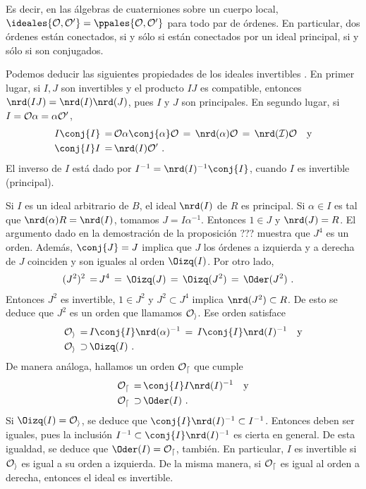 Es decir, en las \'{a}lgebras de cuaterniones sobre un cuerpo local,
$\ideales{\cal{O},\cal{O}'}=\ppales{\cal{O},\cal{O}'}$ para todo par
de \'{o}rdenes. En particular, dos \'{o}rdenes est\'{a}n conectados,
si y s\'{o}lo si est\'{a}n conectados por un ideal principal, si y
s\'{o}lo si son conjugados.

Podemos deducir las siguientes propiedades de los ideales invertibles%
. En primer lugar, si $I,J$ son invertibles y el producto $IJ$ es compatible,
entonces $\nrd(IJ)=\nrd(I)\nrd(J)$, pues $I$ y $J$ son principales.
En segundo lugar, si $I=\cal{O}\alpha=\alpha\cal{O}'$,
\begin{align*}
	I\conj{I} \,=\, & \cal{O}\alpha\conj{\alpha}\cal{O}\,=\,
	\nrd(\alpha)\cal{O}\,=\,\nrd(I)\cal{O}\quad\text{y} \\
	\conj{I}I \,=\, & \nrd(I)\cal{O}'
	\text{ .}
\end{align*}
%
El inverso de $I$ est\'{a} dado por $I^{-1}=\nrd(I)^{-1}\conj{I}$, cuando
$I$ es invertible (principal).

\begin{obsConjugadosEInversos}
Si $I$ es un ideal arbitrario de $B$, el ideal $\nrd(I)$ de $R$ es principal.
Si $\alpha\in I$ es tal que $\nrd(\alpha)R=\nrd(I)$, tomamos $J=I\alpha^{-1}$.
Entonces $1\in J$ y $\nrd(J)=R$. El argumento dado en la demostraci\'{o}n
de la proposici\'{o}n ??? muestra que $J^{4}$ es un orden. Adem\'{a}s,
$\conj{J}=J$ implica que $J$ los \'{o}rdenes a izquierda y a derecha de $J$
coinciden y son iguales al orden $\Oizq(I)$. Por otro lado,
\begin{align*}
 (J^{2})^{2} \,=\, & J^{4}
	\,=\,\Oizq(J)\,=\,\Oizq(J^{2}) \,=\, \Oder(J^{2})
	\text{ .}
\end{align*}
%
Entonces $J^{2}$ es invertible, $1\in J^{2}$ y $J^{2}\subset J^{4}$
implica $\nrd(J^{2})\subset R$. De esto se deduce que $J^{2}$ es un orden
que llamamos $\cal{O}_{i}$. Ese orden satisface
\begin{align*}
 \cal{O}_{i} \,=\, & I\conj{I}\nrd(\alpha)^{-1}
	\,=\, I\conj{I}\nrd(I)^{-1}\quad\text{y} \\
	\cal{O}_{i}\,\supset\, & \Oizq(I)
	\text{ .}
\end{align*}
%
De manera an\'{a}loga, hallamos un orden $\cal{O}_{d}$ que cumple
\begin{align*}
 \cal{O}_{d} \,=\, & \conj{I}I\nrd(I)^{-1}\quad\text{y} \\
	\cal{O}_{d} \,\supset\, & \Oder(I)
	\text{ .}
\end{align*}
%
Si $\Oizq(I)=\cal{O}_{i}$, se deduce que $\conj{I}\nrd(I)^{-1}\subset I^{-1}$.
Entonces deben ser iguales, pues la inclusi\'{o}n
$I^{-1}\subset\conj{I}\nrd(I)^{-1}$ es cierta en general.
De esta igualdad, se deduce que
$\Oder(I)=\cal{O}_{d}$, tambi\'{e}n. En particular, $I$ es invertible
si $\cal{O}_{i}$ es igual a su orden a izquierda. De la misma manera,
si $\cal{O}_{d}$ es igual al orden a derecha, entonces el ideal es invertible.
\end{obsConjugadosEInversos}

